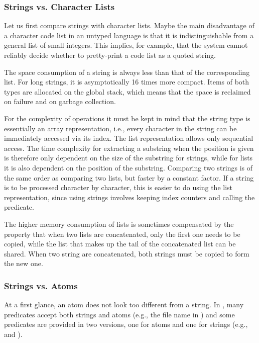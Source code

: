 \subsubsection{Strings vs. Character Lists}
Let us first compare strings with character lists.
Maybe the main disadvantage of a character code list in an untyped language
is that it is indistinguishable from a general list of small integers.
This implies, for example, that the system cannot reliably decide whether
to pretty-print a code list as a quoted string.

The space consumption of a string is always less than that of the corresponding
list. For long strings, it is asymptotically 16 times more compact.
Items of both types are allocated on the global stack, which means that
the space is reclaimed on failure and on garbage collection.

For the complexity of operations it must be kept in mind that the string type
is essentially an array representation, i.e., every character in the string
can be immediately accessed via its index.
The list representation allows only sequential access.
The time complexity for extracting a substring when the position is given
is therefore only dependent on the size of the substring for strings,
while for lists it is also dependent on the position of the substring.
Comparing two strings is of the same order as comparing two lists, but
faster by a constant factor.
If a string is to be processed character by character, this is easier to
do using the list representation, since using strings involves keeping
index counters and calling the
 predicate.

The higher memory consumption of lists is sometimes compensated by the
property that when two lists are concatenated, only the first one needs
to be copied, while the list that makes up the tail of the concatenated
list can be shared.
When two string are concatenated, both strings must be copied to form
the new one.

\subsubsection{Strings vs. Atoms}
At a first glance, an atom does not look too different from a string.
In {\eclipse}, many predicates accept both strings and atoms (e.g.,
the file name
in ) and some predicates are provided in two versions, one for
atoms and one for strings (e.g.,  and
).

